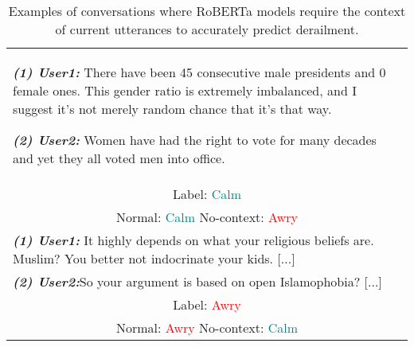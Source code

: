 \begin{table}[t]
\renewcommand{\arraystretch}{1.0}
    \begin{tabularx}{\linewidth}{|X|}
        \hline
        \textbf{\textit{(1) User1:}} There have been 45 consecutive male presidents and 0 female ones. This gender ratio is extremely imbalanced, and I suggest it's not merely random chance that it's that way.

        \textbf{\textit{(2) User2:}} Women have had the right to vote for many decades and yet they all voted men into office.
        \\
        \multicolumn{1}{|c|}{Label: \textcolor{teal}{Calm}}
        \\ \multicolumn{1}{|c|}{Normal: \textcolor{teal}{Calm}\quad
        No-context: \textcolor{red}{Awry}}
        \\
        \hline

       \textbf{\textit{(1) User1:}} It highly depends on what your religious beliefs are. Muslim? You better not indocrinate your kids.  [...]
       \\
        \textbf{\textit{(2) User2:}}So your argument is based on open Islamophobia?   [...]
        \\
        \multicolumn{1}{|c|}{Label: \textcolor{red}{Awry}} \\
        \multicolumn{1}{|c|}{Normal: \textcolor{red}{Awry}\quad        
        No-context: \textcolor{teal}{Calm}}\\
        
        \hline

    \end{tabularx}

\caption{Examples of conversations where RoBERTa models require the context of current utterances to accurately predict derailment.}
\label{tab:intersection-example}
\end{table}
